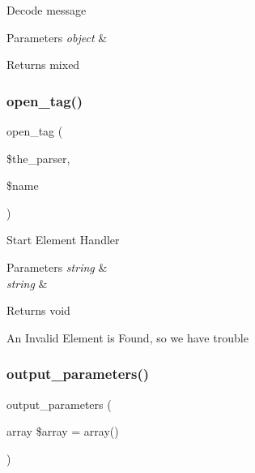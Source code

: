 Decode message


\begin{DoxyParams}{Parameters}
{\em object} & \\
\hline
\end{DoxyParams}
\begin{DoxyReturn}{Returns}
mixed 
\end{DoxyReturn}
\mbox{\label{class_x_m_l___r_p_c___message_a7709ec5b6f0e3769592f8afdc23b9169}} 
\subsubsection{\texorpdfstring{open\+\_\+tag()}{open\_tag()}}
{\footnotesize\ttfamily open\+\_\+tag (\begin{DoxyParamCaption}\item[{}]{\$the\+\_\+parser,  }\item[{}]{\$name }\end{DoxyParamCaption})}

Start Element Handler


\begin{DoxyParams}{Parameters}
{\em string} & \\
\hline
{\em string} & \\
\hline
\end{DoxyParams}
\begin{DoxyReturn}{Returns}
void 
\end{DoxyReturn}
An Invalid Element is Found, so we have trouble \mbox{\label{class_x_m_l___r_p_c___message_a763d97af7e5ff17493db7ecbd1064ba9}} 
\subsubsection{\texorpdfstring{output\+\_\+parameters()}{output\_parameters()}}
{\footnotesize\ttfamily output\+\_\+parameters (\begin{DoxyParamCaption}\item[{array}]{\$array = {\ttfamily array()} }\end{DoxyParamCaption})}

